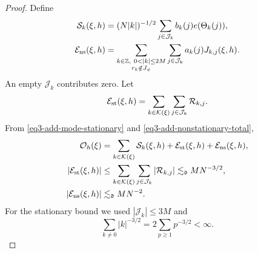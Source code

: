 \documentclass[reqno,12pt]{amsart}
\def \Z {\mathbb Z}
\numberwithin{equation}{section}
\begin{document}
\begin{proof}
Define
\[
 \begin{aligned}
 \mathcal S_k(\xi,h)&=(N|k|)^{-1/2}
             \sum_{j\in\mathcal J_k}b_k(j)e(\Theta_k(j)),\\
 \mathcal E_{\rm ns}(\xi,h)&=
 \sum_{\substack{k\in\Z,\ 0<|k|\le2M\\r_k\notin J_\psi}}
 \sum_{j\in\mathcal J_k}a_k(j)J_{k,j}(\xi,h).
 \end{aligned}
\]
An empty $\mathcal J_k$ contributes zero. Let
$$\mathcal E_{\rm st}(\xi,h)=\sum_{k\in\mathcal K(\xi)}\sum_{j\in\mathcal J_k}\mathcal R_{k,j}.$$ From
\eqref{eq3-add-mode-stationary} and
\eqref{eq3-add-nonstationary-total},
\begin{equation}
 \begin{split}
 \mathcal O_h(\xi)&=\sum_{k\in\mathcal K(\xi)}\mathcal S_k(\xi,h)
                 +\mathcal E_{\rm st}(\xi,h)+\mathcal E_{\rm ns}(\xi,h),\\
 |\mathcal E_{\rm st}(\xi,h)|
 &\le\sum_{k\in\mathcal K(\xi)}\sum_{j\in\mathcal J_k}
                  |\mathcal R_{k,j}|\lesssim_{\mathfrak d}MN^{-3/2},\\
 |\mathcal E_{\rm ns}(\xi,h)|&\lesssim_{\mathfrak d}MN^{-2}.
 \end{split}
 \label{eq3-add-remainder-sum}
\end{equation}
For the stationary bound we used
$|\mathcal J_k|\le3M$ and
$$\sum_{k\ne0}|k|^{-3/2}=2\sum_{p\ge1}p^{-3/2}<\infty.$$


\end{proof}
\end{document}
